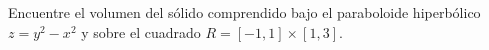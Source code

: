 \item Encuentre el volumen del sólido comprendido bajo el paraboloide hiperbólico $z = y^2 - x^2$ y sobre el cuadrado $R = [-1, 1] \times [1, 3]$.
